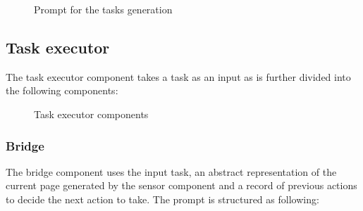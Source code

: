 \begin{figure}
\centering
{}
\caption{Prompt for the tasks generation}
\end{figure}

\subsection{Task executor}\label{task-executor}

The task executor component takes a task as an input as is further
divided into the following components:

\begin{figure}
\centering
{}
\caption{Task executor components}
\end{figure}

\subsubsection{Bridge}\label{bridge}

The bridge component uses the input task, an abstract representation of
the current page generated by the sensor component and a record of
previous actions to decide the next action to take. The prompt is
structured as following:

